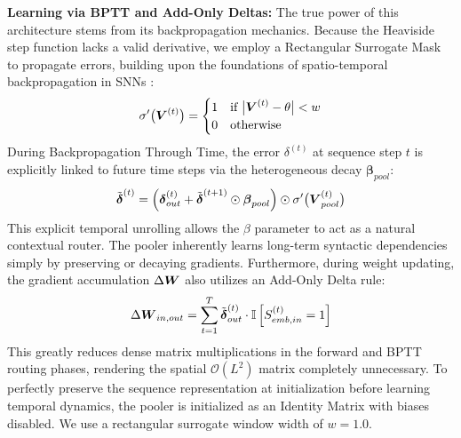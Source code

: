 \documentclass[final]{clv2025}
\begin{document}
\textbf{Learning via BPTT and Add-Only Deltas:} The true power of this architecture stems from its backpropagation mechanics. Because the Heaviside step function lacks a valid derivative, we employ a Rectangular Surrogate Mask to propagate errors, building upon the foundations of spatio-temporal backpropagation in SNNs \citep{neftci2019surrogate}:
\begin{equation}
\sigma'\big(\boldsymbol{V}^{(t)}\big) = \begin{cases} 1 & \text{if } \big|\boldsymbol{V}^{(t)} - \theta\big| < w \\ 0 & \text{otherwise} \end{cases}
\end{equation}
During Backpropagation Through Time, the error $\delta^{(t)}$ at sequence step $t$ is explicitly linked to future time steps via the heterogeneous decay $\bm{\beta}_{pool}$:
\begin{equation}
\tilde{\boldsymbol{\delta}}^{(t)} = \left( \boldsymbol{\delta}_{out}^{(t)} + \tilde{\boldsymbol{\delta}}^{(t+1)} \odot \boldsymbol{\beta}_{pool} \right) \odot \sigma'\big(\boldsymbol{V}_{pool}^{(t)}\big)
\end{equation}
This explicit temporal unrolling allows the $\beta$ parameter to act as a natural contextual router. The pooler inherently learns long-term syntactic dependencies simply by preserving or decaying gradients. Furthermore, during weight updating, the gradient accumulation $\Delta \boldsymbol{W}$ also utilizes an Add-Only Delta rule:
\begin{equation}
\Delta \boldsymbol{W}_{in, out} = \sum_{t=1}^{T} \tilde{\boldsymbol{\delta}}^{(t)}_{out} \cdot \mathbb{I}\left[ S_{emb, in}^{(t)} = 1 \right]
\end{equation}
This greatly reduces dense matrix multiplications in the forward and BPTT routing phases, rendering the spatial $\mathcal{O}(L^2)$ matrix completely unnecessary. To perfectly preserve the sequence representation at initialization before learning temporal dynamics, the pooler is initialized as an Identity Matrix with biases disabled. We use a rectangular surrogate window width of $w=1.0$.
\end{document}

